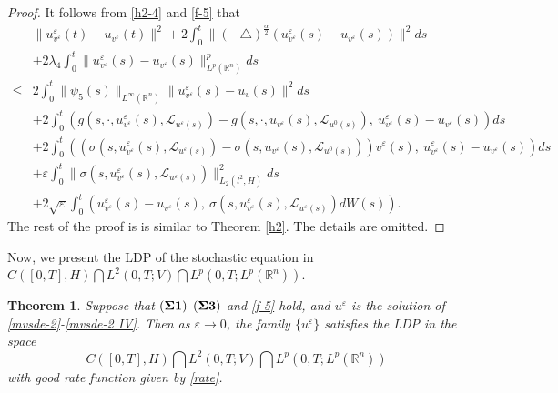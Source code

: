 \documentclass[11pt]{article}
\numberwithin{equation}{section}
\theoremstyle{plain}
\newtheorem{theorem}{Theorem}[section]
\def\leq{\leqslant}
\begin{document}
 \begin{proof}
    It follows from \eqref{h2-4} and \eqref{f-5} that
    \begin{align*}\label{sd-2}
        & \| u_{v^\varepsilon}^\varepsilon(t) - u_{v^\varepsilon}(t) \|^2
        + 2 \int_0^t \| (-\triangle)^{\frac{\alpha}{2}}
        \left( u_{v^\varepsilon}^\varepsilon (s)
        - u_{v^\varepsilon}(s)
        \right)
        \|^2 ds  \nonumber \\
        & + 2 \lambda_4 \int_0^t
        \| u_{v^\varepsilon}^\varepsilon (s)
        - u_{v^\varepsilon}(s) \|_{L^p(\mathbb{R}^n)}^p ds
        \nonumber \\
        \leq & 2 \int_{0}^{t} \| \psi_5(s) \|_{L^\infty(\mathbb{R}^n)}
        \| u_{v^\varepsilon}^\varepsilon(s) - u_v(s) \|^2 ds
        \nonumber \\
        & + 2 \int_{0}^{t}
        \left( g(s, \cdot, u_{v^\varepsilon}^\varepsilon(s), \mathcal{L}_{u^\varepsilon(s)} )
        - g(s, \cdot, u_{v^\varepsilon}(s), \mathcal{L}_{u^0(s)} ),\
        u_{v^\varepsilon}^\varepsilon(s) - u_{v^\varepsilon}(s)
        \right) ds  \nonumber \\
        & + 2 \int_{0}^{t}
        \left(
        \left( \sigma(s, u_{v^\varepsilon}^\varepsilon(s), \mathcal{L}_{u^\varepsilon(s)} )
        - \sigma(s, u_{v^\varepsilon}(s), \mathcal{L}_{u^0(s)} )
        \right) v^\varepsilon(s),\
        u_{v^\varepsilon}^\varepsilon(s) - u_{v^\varepsilon}(s)
        \right) ds  \nonumber \\
        & + \varepsilon \int_{0}^{t}
        \| \sigma(s, u_{v^\varepsilon}^\varepsilon(s), \mathcal{L}_{u^\varepsilon(s)} ) \|^2_{L_2(l^2, H)}ds
        \nonumber \\
        & + 2 \sqrt{\varepsilon} \int_{0}^{t}
        \left( u_{v^\varepsilon}^\varepsilon(s) - u_{v^\varepsilon}(s),\
        \sigma(s, u_{v^\varepsilon}^\varepsilon(s), \mathcal{L}_{u^\varepsilon(s)} ) dW(s)
        \right).
    \end{align*}
    The rest of the proof is
    is similar to   Theorem \ref{h2}. The details are omitted.
 \end{proof}

 Now, we present the LDP
 of the stochastic equation  in
 $ C([0,T], H) \bigcap L^2(0,T; V) \bigcap L^p(0,T; L^p(\mathbb{R}^n ) )
 $.

 \begin{theorem}\label{main-sd}
    Suppose that $({\bf \Sigma 1})$-$({\bf \Sigma 3})$ and \eqref{f-5} hold,
    and $u^\varepsilon$ is the solution of \eqref{mvsde-2}-\eqref{mvsde-2 IV}.
    Then as $\varepsilon \rightarrow 0$, the family $\{ u^\varepsilon \}$
    satisfies the
    LDP in the space
    $$ C([0,T], H)  \bigcap  L^2(0,T; V) \bigcap L^p(0,T; L^p(\mathbb{R}^n ) ) $$
    with   good rate function   given by \eqref{rate}.
 \end{theorem}
\end{document}
